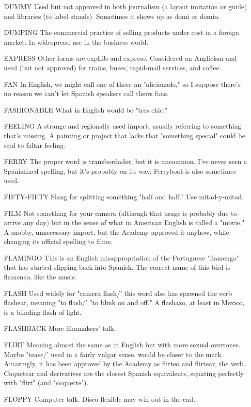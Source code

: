 DUMMY Used but not approved in both journalism (a layout
imitation or guide) and libraries (to label stands). Sometimes it shows
up as domi or domio.

DUMPING The commercial practice of selling products under
cost in a foreign market. In widespread use in the business world.

EXPRESS Other forms are expIl3s and expreso. Considered an
Anglicism and used (but not approved) for trains, buses, rapid-mail services, and coffee.

FAN In English, we might call one of these an "aficionado,"
so I suppose there's no reason we can't let Spanish speakers call
theirs fans.

FASHIONABLE What in English would be "tres chic."

FEELING A strange and regionally used import, usually referring to something that's missing. A painting or project that lacks that
"something special" could be said to faltar feeling.

FERRY The proper word is transbordador, but it is uncommon. I've never seen a Spanishized spelling, but it's probably on its
way. Ferryboat is also sometimes used.

FIFTY-FIFTY Slang for splitting something "half and half."
Use mitad-y-mitad.

FILM Not something for your camera (although that usage is
probably due to arrive any day) but in the sense of what in American
English is called a "movie." A snobby, unnecessary import, but the
Academy approved it anyhow, while changing its official spelling to
filme.

FLAMINGO This is an English misappropriation of the Portuguese "flamengo" that has started slipping back into Spanish. The correct name of this bird is flamenco, like the music.

FLASH Used widely for "camera flash/' this word also has
spawned the verb flashear, meaning "to flash/' "to blink on and off."
A flashazo, at least in Mexico, is a blinding flash of light.

FLASHBACK More filmmakers' talk.

FLIRT Meaning almost the same as in English but with more
sexual overtones. Maybe "tease/' used in a fairly vulgar sense, would be
closer to the mark. Amazingly, it has been approved by the Academy as
flirteo and flirtear, the verb. Coquetear and derivatives are the closest
Spanish equivalents, equating perfectly with "flirt" (and "coquette").

FLOPPY Computer talk. Disco flexible may win out in the end.

